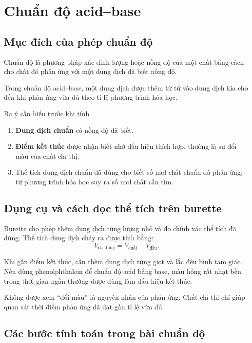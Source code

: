 \section{Chuẩn độ acid--base}

\subsection{Mục đích của phép chuẩn độ}

Chuẩn độ là phương pháp xác định lượng hoặc nồng độ của một chất bằng cách cho chất đó phản ứng với một dung dịch đã biết nồng độ.

Trong chuẩn độ acid--base, một dung dịch được thêm từ từ vào dung dịch kia cho đến khi phản ứng vừa đủ theo tỉ lệ phương trình hóa học.

\begin{ghinho}{Ba ý cần hiểu trước khi tính}
\begin{enumerate}
\item \textbf{Dung dịch chuẩn} có nồng độ đã biết.
\item \textbf{Điểm kết thúc} được nhận biết nhờ dấu hiệu thích hợp, thường là sự đổi màu của chất chỉ thị.
\item Thể tích dung dịch chuẩn đã dùng cho biết số mol chất chuẩn đã phản ứng; từ phương trình hóa học suy ra số mol chất cần tìm.
\end{enumerate}
\end{ghinho}

\subsection{Dụng cụ và cách đọc thể tích trên burette}

Burette cho phép thêm dung dịch từng lượng nhỏ và đo chính xác thể tích đã dùng. Thể tích dung dịch chảy ra được tính bằng:
\[
V_{\text{đã dùng}}=V_{\text{cuối}}-V_{\text{đầu}}.
\]

Khi gần điểm kết thúc, cần thêm dung dịch từng giọt và lắc đều bình tam giác. Nếu dùng phenolphthalein để chuẩn độ acid bằng base, màu hồng rất nhạt bền trong thời gian ngắn thường được dùng làm dấu hiệu kết thúc.

\begin{notechem}
Không được xem ``đổi màu'' là nguyên nhân của phản ứng. Chất chỉ thị chỉ giúp quan sát thời điểm phản ứng đã đạt gần tỉ lệ vừa đủ.
\end{notechem}

\subsection{Các bước tính toán trong bài chuẩn độ}

